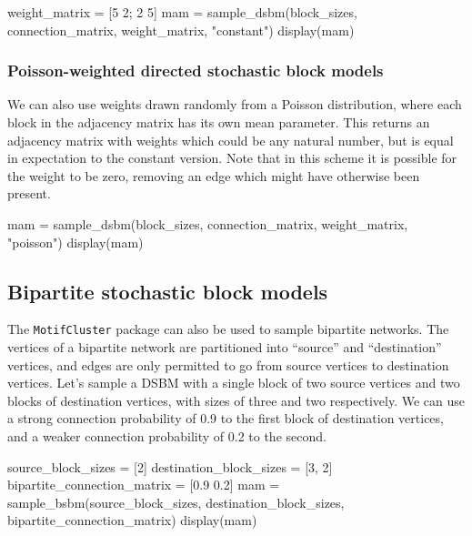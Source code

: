 \documentclass{article}
\begin{document}
\begin{tcolorbox}[colback=black!5!white,colframe=black!15!white]
\begin{juliablock}
weight_matrix = [5 2; 2 5]
mam = sample_dsbm(block_sizes, connection_matrix, weight_matrix, "constant")
display(mam)
\end{juliablock}
\texttt{\obeylines\printpythontex}
\end{tcolorbox}

\subsubsection{Poisson-weighted directed stochastic block models}

We can also use weights drawn randomly from a Poisson distribution,
where each block in the adjacency matrix has its own mean parameter.
This returns an adjacency matrix with weights which could be any natural
number, but is equal in expectation to the constant version.
Note that in this scheme it is possible for the weight to be zero,
removing an edge which might have otherwise been present.

\begin{tcolorbox}[colback=black!5!white,colframe=black!15!white]
\begin{juliablock}
mam = sample_dsbm(block_sizes, connection_matrix, weight_matrix, "poisson")
display(mam)
\end{juliablock}
\texttt{\obeylines\printpythontex}
\end{tcolorbox}


\subsection{Bipartite stochastic block models}

The \texttt{MotifCluster} package can also be used to sample
bipartite networks.
The vertices of a bipartite network are partitioned
into ``source'' and ``destination'' vertices,
and edges are only permitted to go from source vertices
to destination vertices.
Let's sample a DSBM with a single block of two source vertices
and two blocks of destination vertices, with
sizes of three and two respectively.
We can use a strong connection probability of 0.9 to the first block of
destination vertices,
and a weaker connection probability of 0.2 to the second.

\begin{tcolorbox}[colback=black!5!white,colframe=black!15!white]
\begin{juliablock}
source_block_sizes = [2]
destination_block_sizes = [3, 2]
bipartite_connection_matrix = [0.9 0.2]
mam = sample_bsbm(source_block_sizes, destination_block_sizes,
                  bipartite_connection_matrix)
display(mam)
\end{juliablock}
\texttt{\obeylines\printpythontex}
\end{tcolorbox}
\end{document}
